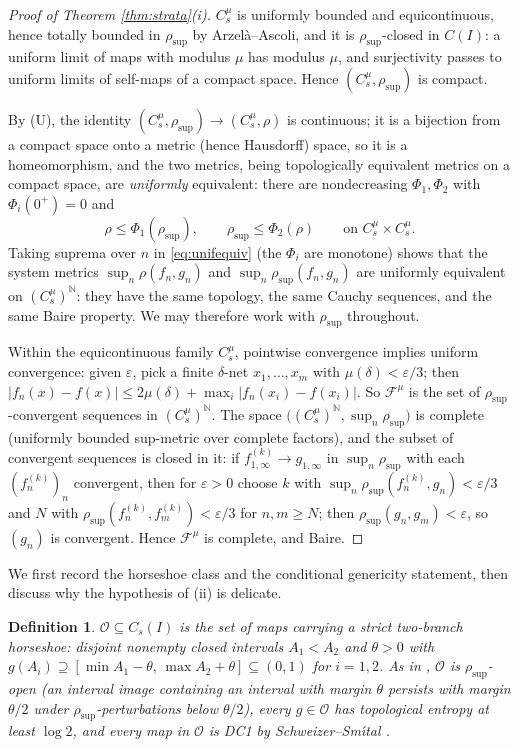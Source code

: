 ﻿\documentclass[11pt]{article}
\newtheorem{definition}[theorem]{Definition}
\newcommand{\I}{I}
\newcommand{\Cs}{C_s(\I)}
\newcommand{\rsup}{\rho_{\sup}}
\begin{document}
\begin{proof}[Proof of Theorem \ref{thm:strata}(i)]
$C^\mu_s$ is uniformly bounded and equicontinuous, hence totally bounded in
$\rsup$ by Arzel\`a--Ascoli, and it is $\rsup$-closed in $C(\I)$: a uniform limit
of maps with modulus $\mu$ has modulus $\mu$, and surjectivity passes to uniform
limits of self-maps of a compact space.  Hence $(C^\mu_s,\rsup)$ is compact.

By (U), the identity $(C^\mu_s,\rsup)\to(C^\mu_s,\rho)$ is continuous; it is a
bijection from a compact space onto a metric (hence Hausdorff) space, so it is a
homeomorphism, and the two metrics, being topologically equivalent metrics on a
compact space, are \emph{uniformly} equivalent: there are nondecreasing
$\Phi_1,\Phi_2$ with $\Phi_i(0^+)=0$ and
\begin{equation}\label{eq:unifequiv}
\rho\le\Phi_1(\rsup),
\qquad
\rsup\le\Phi_2(\rho)
\qquad\text{on }C^\mu_s\times C^\mu_s .
\end{equation}
Taking suprema over $n$ in \eqref{eq:unifequiv} (the $\Phi_i$ are monotone) shows
that the system metrics $\sup_n\rho(f_n,g_n)$ and $\sup_n\rsup(f_n,g_n)$ are
uniformly equivalent on $(C^\mu_s)^{\mathbb N}$: they have the same topology, the
same Cauchy sequences, and the same Baire property.  We may therefore work with
$\rsup$ throughout.

Within the equicontinuous family $C^\mu_s$, pointwise convergence implies uniform
convergence: given $\varepsilon$, pick a finite $\delta$-net $x_1,\dots,x_m$ with
$\mu(\delta)<\varepsilon/3$; then
$|f_n(x)-f(x)|\le2\mu(\delta)+\max_i|f_n(x_i)-f(x_i)|$.  So $\mathcal F^\mu$ is
the set of $\rsup$-convergent sequences in $(C^\mu_s)^{\mathbb N}$.  The space
$\bigl((C^\mu_s)^{\mathbb N},\sup_n\rsup\bigr)$ is complete (uniformly bounded
sup-metric over complete factors), and the subset of convergent sequences is
closed in it: if $f^{(k)}_{1,\infty}\to g_{1,\infty}$ in $\sup_n\rsup$ with each
$(f^{(k)}_n)_n$ convergent, then for $\varepsilon>0$ choose $k$ with
$\sup_n\rsup(f^{(k)}_n,g_n)<\varepsilon/3$ and $N$ with
$\rsup(f^{(k)}_n,f^{(k)}_m)<\varepsilon/3$ for $n,m\ge N$; then
$\rsup(g_n,g_m)<\varepsilon$, so $(g_n)$ is convergent.  Hence
$\mathcal F^\mu$ is complete, and Baire.
\end{proof}

We first record the horseshoe class and the conditional genericity statement,
then discuss why the hypothesis of (ii) is delicate.

\begin{definition}\label{def:O-recall}
$\mathcal O\subseteq\Cs$ is the set of maps carrying a \emph{strict two-branch
horseshoe}: disjoint nonempty closed intervals $A_1<A_2$ and $\theta>0$ with
$g(A_i)\supseteq[\min A_1-\theta,\,\max A_2+\theta]\subseteq(0,1)$ for $i=1,2$.
As in \cite{companion}, $\mathcal O$ is $\rsup$-open (an interval image
containing an interval with margin $\theta$ persists with margin $\theta/2$
under $\rsup$-perturbations below $\theta/2$), every $g\in\mathcal O$ has
topological entropy at least $\log2$, and every map in $\mathcal O$ is DC1 by
Schweizer--Sm\'\i tal \cite{SS}.
\end{definition}
\end{document}
